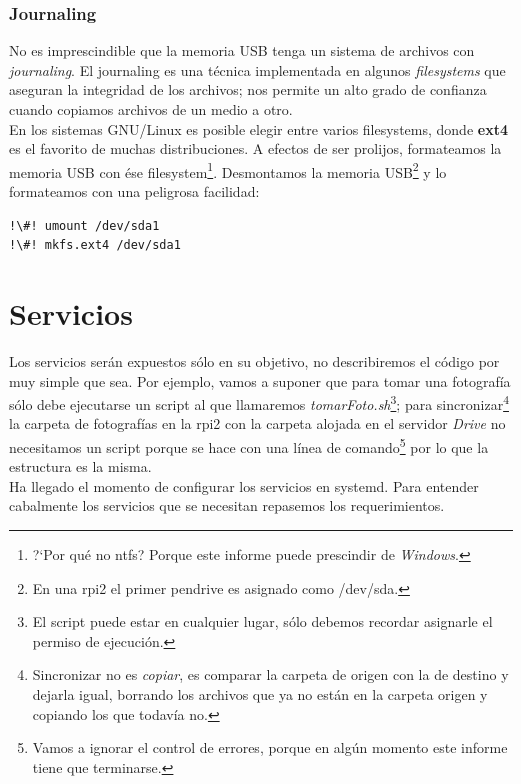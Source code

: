 \documentclass[10pt,a4paper]{article}
\begin{document}
\subsubsection{Journaling}

No es imprescindible que la memoria USB tenga un sistema de archivos con \emph{journaling}. El journaling es una t\'ecnica implementada en algunos \emph{filesystems} que aseguran la integridad de los archivos; nos permite un alto grado de confianza cuando copiamos archivos de un medio a otro.\\

En los sistemas GNU/Linux es posible elegir entre varios filesystems, donde \textbf{ext4} es el favorito de muchas distribuciones. A efectos de ser prolijos, formateamos la memoria USB con \'ese filesystem\footnote{?`Por qu\'e no ntfs? Porque este informe puede prescindir de \emph{Windows}.}. Desmontamos la memoria USB\footnote{En una rpi2 el primer pendrive es asignado como /dev/sda.} y lo formateamos con una peligrosa facilidad:

\begin{lstlisting}
!\#! umount /dev/sda1
!\#! mkfs.ext4 /dev/sda1
\end{lstlisting}

\section{Servicios}

Los servicios ser\'an expuestos s\'olo en su objetivo, no describiremos el c\'odigo por muy simple que sea. Por ejemplo, vamos a suponer que para tomar una fotograf\'ia s\'olo debe ejecutarse un script al que llamaremos \emph{tomarFoto.sh}\footnote{El script puede estar en cualquier lugar, s\'olo debemos recordar asignarle el permiso de ejecuci\'on.}; para sincronizar\footnote{Sincronizar no es \emph{copiar}, es comparar la carpeta de origen con la de destino y dejarla igual, borrando los archivos que ya no est\'an en la carpeta origen y copiando los que todav\'ia no.} la carpeta de fotograf\'ias en la rpi2 con la carpeta alojada en el servidor \emph{Drive} no necesitamos un script porque se hace con una l\'inea de comando\footnote{Vamos a ignorar el control de errores, porque en alg\'un momento este informe tiene que terminarse.} por lo que la estructura es la misma.\\

Ha llegado el momento de configurar los servicios en systemd. Para entender cabalmente los servicios que se necesitan repasemos los requerimientos.\\
\end{document}

